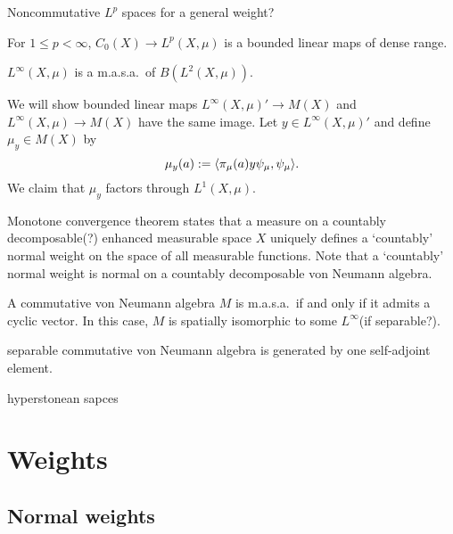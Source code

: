 \documentclass{../../large}
\begin{document}
\begin{prb}
Noncommutative $L^p$ spaces for a general weight?
\begin{parts}
\item For $1\le p<\infty$, $C_0(X)\to L^p(X,\mu)$ is a bounded linear maps of dense range.
\item $L^\infty(X,\mu)$ is a m.a.s.a.~of $B(L^2(X,\mu))$.
\end{parts}
\end{prb}
\begin{pf}
We will show bounded linear maps $L^\infty(X,\mu)'\to M(X)$ and $L^\infty(X,\mu)\to M(X)$ have the same image.
Let $y\in L^\infty(X,\mu)'$ and define $\mu_y\in M(X)$ by
\[\mu_y(a):=\langle\pi_\mu(a)y\psi_\mu,\psi_\mu\rangle.\]
We claim that $\mu_y$ factors through $L^1(X,\mu)$.
\end{pf}

Monotone convergence theorem states that a measure on a countably decomposable(?) enhanced measurable space $X$ uniquely defines a `countably' normal weight on the space of all measurable functions.
Note that a `countably' normal weight is normal on a countably decomposable von Neumann algebra.



\begin{prb}
A commutative von Neumann algebra $M$ is m.a.s.a.~if and only if it admits a cyclic vector.
In this case, $M$ is spatially isomorphic to some $L^\infty$(if separable?).
\end{prb}
\begin{pf}
\end{pf}

separable commutative von Neumann algebra is generated by one self-adjoint element.

hyperstonean sapces





\chapter{Weights}

\section{Normal weights}

\begin{prb}
\end{prb}
\end{document}
